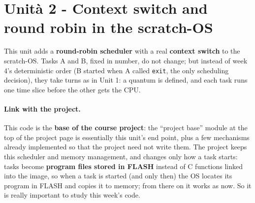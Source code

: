\section{Unità 2 - Context switch and round robin in the scratch-OS}
This unit adds a \textbf{round-robin scheduler} with a real \textbf{context switch} to the scratch-OS. Tasks A and B, fixed in number, do not change; but instead of week 4's deterministic order (B started when A called \texttt{exit}, the only scheduling decision), they take turns as in Unit 1: a quantum is defined, and each task runs one time slice before the other gets the CPU.

\paragraph{Link with the project.} This code is the \textbf{base of the course project}: the ``project base'' module at the top of the project page is essentially this unit's end point, plus a few mechanisms already implemented so that the project need not write them. The project keeps this scheduler and memory management, and changes only how a task starts: tasks become \textbf{program files stored in FLASH} instead of C functions linked into the image, so when a task is started (and only then) the OS locates its program in FLASH and copies it to memory; from there on it works as now. So it is really important to study this week's code.

